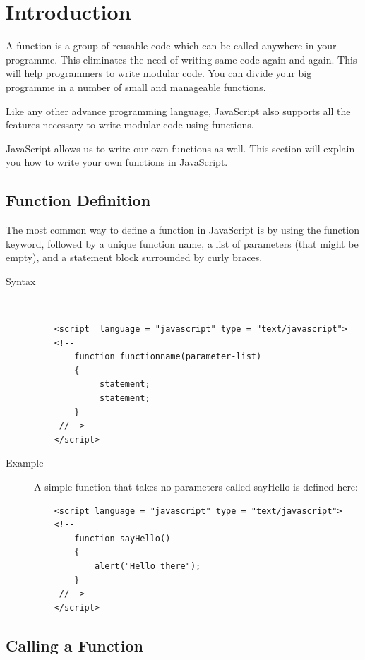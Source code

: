 \documentclass[11pt,a4paper]{article}
\author{TalentSprint}
\date{}
\begin{document}
\section*{Introduction}

A function is a group of reusable code which can be called anywhere in your programme. This eliminates the need of writing same code again and again. This will help programmers to write modular code. You can divide your big programme in a number of small and manageable functions.

Like any other advance programming language, JavaScript also supports all the features necessary to write modular code using functions.

JavaScript allows us to write our own functions as well. This section will explain you how to write your own functions in JavaScript.

\subsection*{Function Definition}

The most common way to define a function in JavaScript is by using the function keyword, followed by a unique function name, a list of parameters (that might be empty), and a statement block surrounded by curly braces.
\begin{description}

\item[Syntax]\

\begin{verbatim}
    <script  language = "javascript" type = "text/javascript">
    <!--
        function functionname(parameter-list)
        {
             statement;
             statement;
        }
     //-->
    </script>
\end{verbatim}

\item[Example]

A simple function that takes no parameters called sayHello is defined here:\\
\begin{verbatim}
    <script language = "javascript" type = "text/javascript">
    <!--
        function sayHello()
        {
            alert("Hello there");
        }
     //-->
    </script>
\end{verbatim}
\end{description}

\subsection*{Calling a Function}
\end{document}
